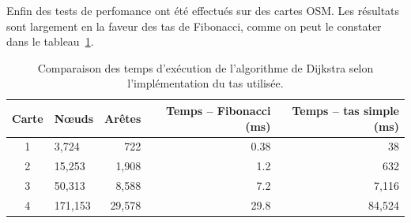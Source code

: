 \documentclass{article}
\begin{document}
Enfin des tests de perfomance ont été effectués sur des cartes
OSM. Les résultats sont largement en la faveur des tas de Fibonacci,
comme on peut le constater dans le tableau~\ref{tab:comp_osm}.
\begin{table}[htbp]
      \centering
      \begin{tabular}{clrrr}
        Carte & Nœuds & Arêtes & Temps -- Fibonacci (ms) & Temps -- tas
                                                     simple (ms)\\
        \hline
        1 & 3,724 & 722 & 0.38 & 38 \\
        2 & 15,253 & 1,908 & 1.2 & 632 \\
        3 & 50,313 & 8,588 & 7.2   & 7,116 \\
        4 & 171,153 & 29,578 & 29.8 & 84,524
      \end{tabular}
      \caption{\label{tab:comp_osm}Comparaison des temps d'exécution de l'algorithme de
        Dijkstra selon l'implémentation du tas utilisée.} 
    \end{table}
\appendix
\end{document}
